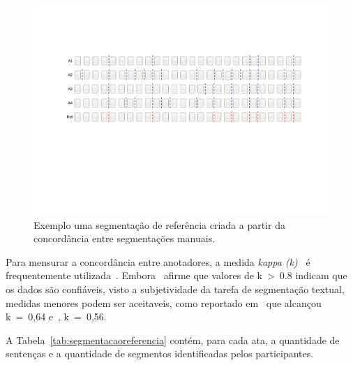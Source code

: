   \begin{center}
	\begin{figure}[h!]

	\includegraphics[trim={ 95 255 75 140 },clip,page=1,width=\textwidth]{conteudo/capitulos/figs/segmentacao-referencia.pdf}

	\caption{Exemplo uma segmentação de referência criada a partir da concordância entre segmentações manuais.}
	\label{fig:concordanciasegref}
	\end{figure}
\end{center}

Para mensurar a concordância entre anotadores, a medida \textit{kappa (k)}~\cite{Carletta1996} é frequentemente utilizada~\cite{Gruenstein2007, Cardoso2017, Hearst1997}. 
Embora~\cite{Carletta1996} afirme que valores de k~>~0.8 indicam que os dados são confiáveis, visto a subjetividade da tarefa de segmentação textual, medidas menores podem ser aceitaveis, como reportado em~\cite{Hearst1997} que alcançou k~=~0,64 e~\cite{Cardoso2017}, k~=~0,56.  

A Tabela~\ref{tab:segmentacaoreferencia} contém, para cada ata, a quantidade de sentenças e a quantidade de segmentos identificadas pelos participantes.


